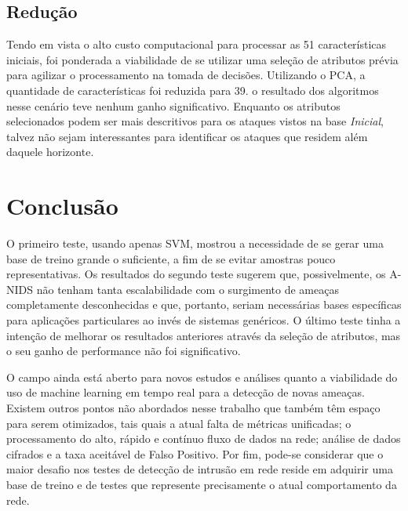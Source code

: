 \documentclass[12pt,a4paper]{article}
\begin{document}
    \subsection{Redução}
    Tendo em vista o alto custo computacional para processar as 51 características iniciais, foi ponderada a viabilidade
    de se utilizar uma seleção de atributos prévia para agilizar o processamento na tomada de decisões. Utilizando o
    PCA, a quantidade de características foi reduzida para 39.
    o resultado dos algoritmos nesse cenário teve nenhum ganho significativo. Enquanto os atributos selecionados podem
    ser mais descritivos para os ataques vistos na base \textit{Inicial}, talvez não sejam interessantes para
    identificar os ataques que residem além daquele horizonte.


\section{Conclusão}
    \par O primeiro teste, usando apenas SVM, mostrou a necessidade de se gerar uma base de treino grande o suficiente, a
    fim de se evitar amostras pouco representativas. Os resultados do segundo teste sugerem que, possivelmente, os A-NIDS
    não tenham tanta escalabilidade com o surgimento de ameaças completamente desconhecidas e que, portanto, seriam
    necessárias bases específicas para aplicações particulares ao invés de sistemas genéricos. O último teste tinha a
    intenção de melhorar os resultados anteriores através da seleção de atributos, mas o seu ganho de performance não foi
    significativo.
    \par O campo ainda está aberto para novos estudos e análises quanto a viabilidade do uso de machine learning em tempo
    real para a detecção de novas ameaças. Existem outros pontos não abordados nesse trabalho que também têm espaço para
    serem otimizados, tais quais a atual falta de métricas unificadas; o processamento do alto, rápido e contínuo fluxo de
    dados na rede; análise de dados cifrados e a taxa aceitável de Falso Positivo. Por fim, pode-se considerar que
     o maior desafio nos testes de detecção de intrusão em rede reside em adquirir uma base de treino e de testes que
 represente precisamente o atual comportamento da rede.
\end{document}
